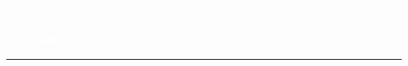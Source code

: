 \begin{titlepage}
\BgThispage
{}
\vspace*{2cm}
\noindent
\textcolor{white}{\centering\bigsf LINMA2171 \\ Analyse numérique II \\ \bf\Huge DEVOIR 1}
\vspace*{3cm}\par
\noindent
%
\begin{minipage}{0.28\linewidth}
    \begin{flushright}
        \printauthor
    \end{flushright}
\end{minipage} \hspace{15pt}
%
\begin{minipage}{0.02\linewidth}
    \rule{1pt}{50pt}
\end{minipage} \hspace{-10pt}
%
\begin{minipage}{0.6\linewidth}
	\begin{abstract}
	TO DO
	\end{abstract}
\end{minipage}


\end{titlepage}
